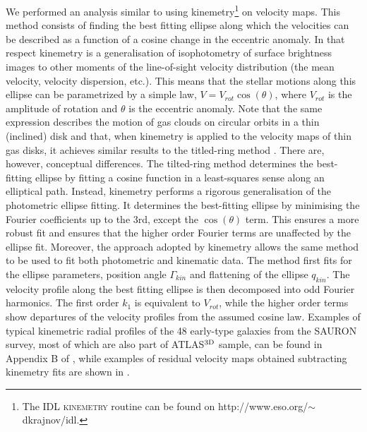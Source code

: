 \documentclass[usenatbib,usegraphicx]{mn2e}
\begin{document}
We performed an analysis similar to  \citet{2008MNRAS.390...93K} using kinemetry\footnote{The IDL \textsc{kinemetry} routine can be found on http://www.eso.org/$\sim$dkrajnov/idl.} \citep{2006MNRAS.366..787K} on velocity maps. This method consists of finding the best fitting ellipse along which the velocities can be described as a function of a cosine change in the eccentric anomaly. In that respect kinemetry is a generalisation of isophotometry of surface brightness images \citep{1978MNRAS.182..797C,1985ApJS...57..473L,1987A&A...177...71B,1987MNRAS.226..747J} to other moments of the line-of-sight velocity distribution (the mean velocity, velocity dispersion, etc.). This means that the stellar motions along this ellipse can be parametrized by a simple law, $V=V_{rot} \cos(\theta)$, where $V_{rot}$ is the amplitude of rotation and $\theta$ is the eccentric anomaly. Note that the same expression describes the motion of gas clouds on circular orbits in a thin (inclined) disk \citep[e.g.][]{1997MNRAS.292..349S,2004ApJ...605..183W} and that, when kinemetry is applied to the velocity maps of thin gas disks, it achieves similar results to the titled-ring method \citep[e.g.][]{1987PhDT.......199B, 1990ApJ...364...23S,1994ApJ...436..642F}. There are, however, conceptual differences. The tilted-ring method determines the best-fitting ellipse by fitting a cosine function in a least-squares sense along an elliptical path. Instead, kinemetry performs a rigorous generalisation of the photometric ellipse fitting. It determines the best-fitting ellipse by minimising the Fourier coefficients up to the 3rd, except the  $\cos(\theta)$ term. This ensures a more robust fit and ensures that the higher order Fourier terms are unaffected by the ellipse fit. Moreover, the approach adopted by kinemetry allows the same method to be used to fit both photometric and kinematic data. The method first fits for the ellipse parameters, position angle $\Gamma_{kin}$ and flattening of the ellipse $q_{kin}$. The velocity profile along the best fitting ellipse is then decomposed into odd Fourier harmonics. The first order $k_1$ is equivalent to $V_{rot}$, while the higher order terms show departures of the velocity profiles from the assumed cosine law. Examples of typical kinemetric radial profiles of the 48 early-type galaxies from the SAURON survey, most of which are also part of ATLAS$^{\rm 3D}$ sample, can be found in Appendix B of \citet{2008MNRAS.390...93K}, while examples of residual velocity maps obtained subtracting kinemetry fits are shown in \citet{2006MNRAS.366..787K}.
\end{document}
